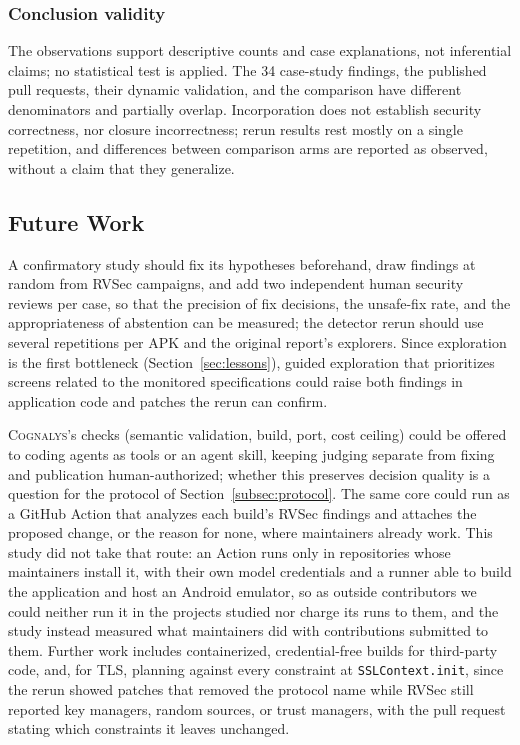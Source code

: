 \documentclass[conference]{IEEEtran}
\newcommand{\system}{\textsc{Cognalys}}
\begin{document}
\subsubsection{Conclusion validity}

The observations support descriptive counts and case explanations, not
inferential claims; no statistical test is applied. The 34 case-study
findings, the published pull requests, their dynamic validation, and the
comparison have different denominators and partially overlap. Incorporation
does not establish security correctness, nor closure incorrectness; rerun
results rest mostly on a single repetition, and differences between comparison
arms are reported as observed, without a claim that they generalize.

\subsection{Future Work}
\label{subsec:future}

A confirmatory study should fix its hypotheses beforehand, draw findings at
random from RVSec campaigns, and add two independent human security reviews
per case, so that the precision of fix decisions, the unsafe-fix rate, and
the appropriateness of abstention can be measured; the detector rerun should
use several repetitions per APK and the original report's explorers. Since
exploration is the first bottleneck (Section~\ref{sec:lessons}), guided
exploration that prioritizes screens related to the
monitored specifications could raise both findings in application code and
patches the rerun can confirm.

\system{}'s checks (semantic validation, build, port, cost ceiling) could be
offered to coding agents as tools or an agent skill, keeping judging separate
from fixing and publication human-authorized; whether this preserves decision
quality is a question for the protocol of Section~\ref{subsec:protocol}. The same core could run as a GitHub
Action that analyzes each build's RVSec findings and attaches the proposed
change, or the reason for none, where maintainers already work. This study did
not take that route: an Action runs only in repositories whose maintainers
install it, with their own model credentials and a runner able to build the
application and host an Android emulator, so as outside contributors we could
neither run it in the projects studied nor charge its runs to them, and the
study instead measured what maintainers did with contributions submitted to
them. Further work includes containerized, credential-free
builds for third-party code, and, for TLS, planning against every constraint
at \texttt{SSLContext.init}, since the rerun showed patches that removed
the protocol name while RVSec still reported key managers, random sources, or
trust managers, with the pull request stating which constraints it leaves
unchanged.
\end{document}
